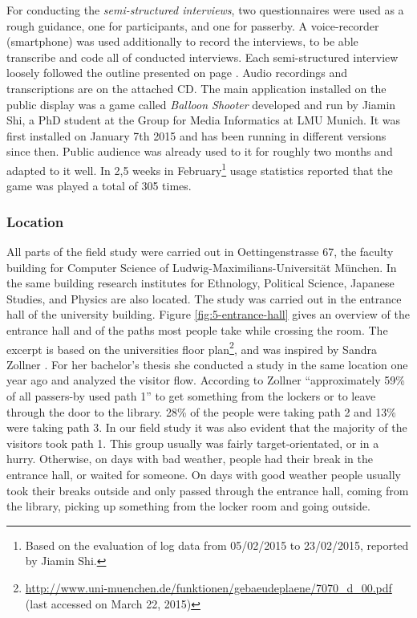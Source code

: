 		For conducting the \textit{semi-structured interviews}, two questionnaires were used as a rough guidance, one for participants, and one for passerby. A voice-recorder (smartphone) was used additionally to record the interviews, to be able transcribe and code all of conducted interviews. Each semi-structured interview loosely followed the outline presented on page \pageref{appendix:semi-structured-interview}. Audio recordings and transcriptions are on the attached CD.
		The main application installed on the public display was a game called \textit{Balloon Shooter} developed and run by Jiamin Shi, a PhD student at the Group for Media Informatics at LMU Munich. It was first installed on January 7th 2015 and has been running in different versions since then. Public audience was already used to it for roughly two months and adapted to it well. In 2,5 weeks in February\footnote{Based on the evaluation of log data from 05/02/2015 to 23/02/2015, reported by Jiamin Shi.} usage statistics reported that the game was played a total of 305 times.



	\subsubsection{Location}

		All parts of the field study were carried out in Oettingenstrasse 67, the faculty building for Computer Science of Ludwig-Maximilians-Universit\"at M\"unchen. In the same building research institutes for Ethnology, Political Science, Japanese Studies, and Physics are also located. The study was carried out in the entrance hall of the university building. Figure \ref{fig:5-entrance-hall} gives an overview of the entrance hall and of the paths most people take while crossing the room. The excerpt is based on the universities floor plan\footnote{\url{http://www.uni-muenchen.de/funktionen/gebaeudeplaene/7070_d_00.pdf} (last accessed on March 22, 2015)}, and was inspired by Sandra Zollner \cite{zollner2014thesis}. For her bachelor's thesis she conducted a study in the same location one year ago and analyzed the visitor flow. According to Zollner ``approximately 59\% of all passers-by used path 1'' to get something from the lockers or to leave through the door to the library. 28\% of the people were taking path 2 and 13\% were taking path 3.
		In our field study it was also evident that the majority of the visitors took path 1. This group usually was fairly target-orientated, or in a hurry. Otherwise, on days with bad weather, people had their break in the entrance hall, or waited for someone. On days with good weather people usually took their breaks outside and only passed through the entrance hall, coming from the library, picking up something from the locker room and going outside.

